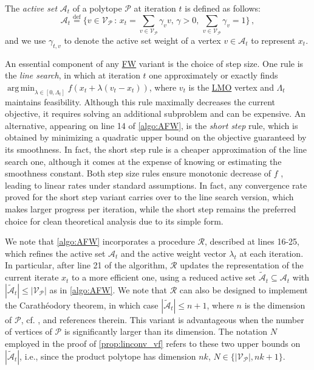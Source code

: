 \documentclass{article}
\newcommand{\mP}{\mathcal{P}}
\newcommand{\mA}{\mathcal{A}}
\newcommand{\verts}[1]{\mathcal{V}_{#1}}
\DeclareMathOperator*{\argmin}{\mathrm{arg\,min}}
\newcommand{\defi}{\stackrel{\mathrm{\scriptscriptstyle def}}{=}}
\newcommand\newlink[2]{\hyperlink{#1}{\normalcolor #2}}
\newcommand{\FW}{\newlink{def:acronym_frank_wolfe}{FW}}
\newcommand{\LMO}{\newlink{def:acronym_linear_minimization_oracle}{LMO}}
\begin{document}
%
The \emph{active set} $\mA_t$ of a polytope $\mP$ at iteration $t$ is defined as follows:
\[
\mA_t \defi \{v \in \verts{\mP}\,:\, x_t = \sum_{v \in \verts{\mP}} \gamma_v v,\, \gamma>0,\, \sum_{v \in \verts{\mP}}\gamma_v = 1\}\,,
\]
and we use $\gamma_{t,v}$ to denote the active set weight of a vertex $v \in \mA_t$ to represent $x_t$.

An essential component of any \FW{} variant is the choice of step size.
One rule is the \emph{line search}, in which at iteration $t$ one approximately or exactly finds $\argmin_{\lambda \in [0,\Lambda_t]} f(x_t + \lambda(v_t - x_t))$, where $v_t$ is the \LMO{} vertex and $\Lambda_t$ maintains feasibility.
Although this rule maximally decreases the current objective, it requires solving an additional subproblem and can be expensive.
An alternative, appearing on line 14 of \cref{algo:AFW}, is the \emph{short step} rule, which is obtained by minimizing a quadratic upper bound on the objective guaranteed by its smoothness. In fact, the short step rule is a cheaper approximation of the line search one, although it comes at the expense of knowing or estimating the smoothness constant.
Both step size rules ensure monotonic decrease of $f$ \cite{BCC+23}, leading to linear rates under standard assumptions.
In fact, any convergence rate proved for the short step variant carries over to the line search version, which makes larger progress per iteration, while the short step remains the preferred choice for clean theoretical analysis due to its simple form.


We note that \cref{algo:AFW} incorporates a procedure $\mathcal{R}$, described at lines 16-25, which refines the active set $\mA_t$ and the active weight vector $\lambda_t$ at each iteration. In particular, after line 21 of the algorithm, $\mathcal{R}$ updates the representation of the current iterate $x_t$ to a more efficient one, using a reduced active set $\tilde{\mA}_t \subseteq \mA_t$ with $|\tilde{\mA}_t| \leq |\verts{\mP}|$ as in \cref{algo:AFW}. We note that $\mathcal{R}$ can also be designed to implement the Carathéodory theorem, in which case $|\tilde{\mA}_t| \le n+1$, where $n$ is the dimension of $\mP$, cf. \cite[Appendix A]{BS15}, \cite{BPW24} and references therein. This variant is advantageous when the number of vertices of $\mP$ is significantly larger than %
its dimension. The notation $N$ employed in the proof of \cref{prop:linconv_vf} refers to these two upper bounds on $|\tilde{\mA}_t|$, i.e., since the product polytope has dimension $nk$, $N \in \{|\verts{\mP}|, nk+1\}$.
\end{document}
